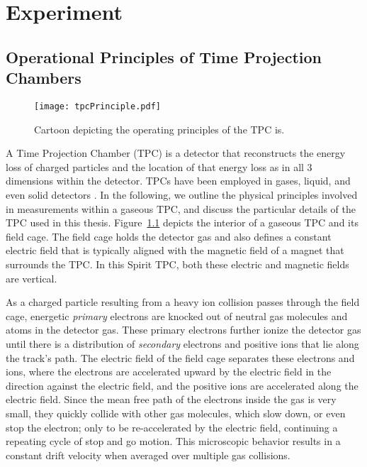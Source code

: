 \chapter{Experiment}

\section{Operational Principles of Time Projection Chambers}

\begin{figure}[!htb]
\centering
\texttt{[image: tpcPrinciple.pdf]}
\caption{Cartoon depicting the operating principles of the TPC is.}
\label{fig:tpcPrinciple}
\end{figure}

A Time Projection Chamber (TPC) is a detector that reconstructs the energy loss of charged particles and the location of that energy loss as in all 3 dimensions within the detector. TPCs have been employed in gases, liquid, and even solid detectors \cite{starTPC,arTPC,eosTPC}. In the following, we outline the physical principles involved in measurements within a gaseous TPC, and discuss the particular details of the TPC used in this thesis. Figure~\ref{fig:tpcPrinciple} depicts the interior of a gaseous TPC and its field cage. The field cage holds the detector gas and also defines a constant electric field that is typically aligned with the magnetic field of a magnet that surrounds the TPC. In this Spirit TPC, both these electric and magnetic fields are vertical.  

As a charged particle resulting from a heavy ion collision passes through the field cage, energetic \emph{primary} electrons are knocked out of neutral gas molecules and atoms in the detector gas. These primary electrons further ionize the detector gas until there is a distribution of \emph{secondary} electrons and positive ions that lie along the track's path. The electric field of the field cage separates these electrons and ions, where the electrons are accelerated upward by the electric field in the direction against the electric field, and the positive ions are accelerated along the electric field. Since the mean free path of the electrons inside the gas is very small, they quickly collide with other gas molecules, which slow down, or even stop the electron; only to be re-accelerated by the electric field, continuing a repeating cycle of stop and go motion. This microscopic behavior results in a constant drift velocity when averaged over multiple gas collisions. 

